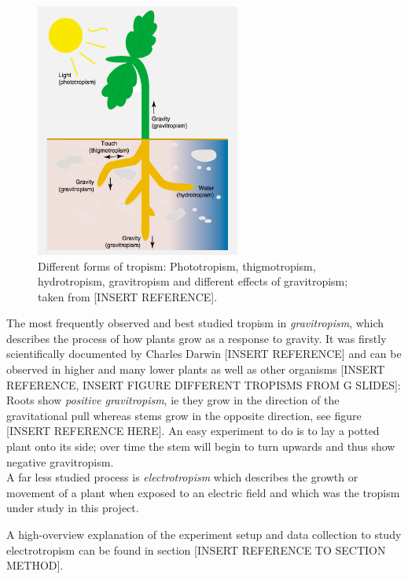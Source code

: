 \begin{figure}[h]
	\centering
	\includegraphics[width=0.6\textwidth]{../Figures/tropism.png}
	\caption{Different forms of tropism: Phototropism, thigmotropism, hydrotropism, gravitropism and different effects of gravitropism; taken from [INSERT REFERENCE].}
	\label{fig:tropism}
\end{figure}

The most frequently observed and best studied tropism in \textit{gravitropism}, which describes the process of how plants grow as a response to gravity. It was firstly scientifically documented by Charles Darwin [INSERT REFERENCE] and can be observed in higher and many lower plants as well as other organisms [INSERT REFERENCE, INSERT FIGURE DIFFERENT TROPISMS FROM G SLIDES]: Roots show \textit{positive gravitropism}, ie they grow in the direction of the gravitational pull whereas stems grow in the opposite direction, see figure [INSERT REFERENCE HERE]. An easy experiment to do is to lay a potted plant onto its side; over time the stem will begin to turn upwards and thus show negative gravitropism. \\
A far less studied process is \textit{electrotropism} which describes the growth or movement of a plant when exposed to an electric field and which was the tropism under study in this project. 

A high-overview explanation of the experiment setup and data collection to study electrotropism can be found in section [INSERT REFERENCE TO SECTION METHOD].

